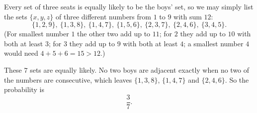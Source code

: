 Every set of three seats is equally likely to be the boys' set, so we may simply list the sets $\{x,y,z\}$ of three different numbers from $1$ to $9$ with sum $12$:
\[
\{1,2,9\},\ \{1,3,8\},\ \{1,4,7\},\ \{1,5,6\},\ \{2,3,7\},\ \{2,4,6\},\ \{3,4,5\}.
\]
(For smallest number $1$ the other two add up to $11$; for $2$ they add up to $10$ with both at least $3$; for $3$ they add up to $9$ with both at least $4$; a smallest number $4$ would need $4+5+6=15>12$.)

These $7$ sets are equally likely. No two boys are adjacent exactly when no two of the numbers are consecutive, which leaves $\{1,3,8\}$, $\{1,4,7\}$ and $\{2,4,6\}$. So the probability is
\[
\boxed{\dfrac{3}{7}}.
\]
